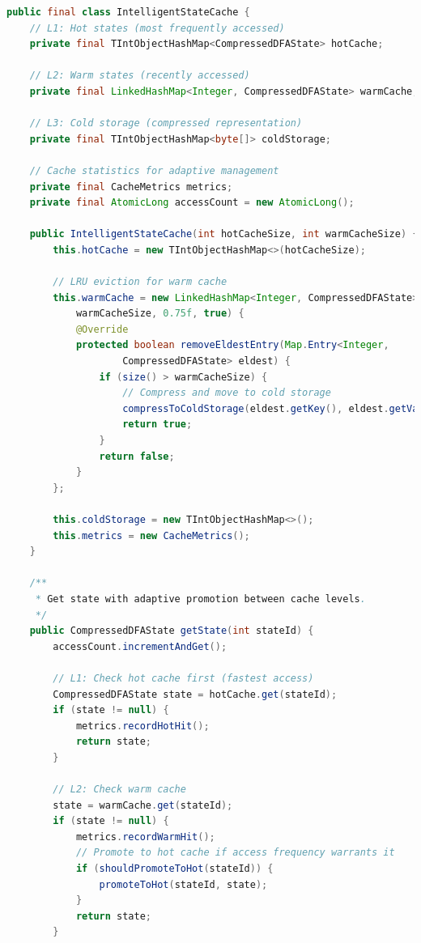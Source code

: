 \documentclass[11pt,a4paper]{article}
\begin{document}
\begin{lstlisting}[language=Java,caption={Multi-Level State Cache Implementation}]
public final class IntelligentStateCache {
    // L1: Hot states (most frequently accessed)
    private final TIntObjectHashMap<CompressedDFAState> hotCache;
    
    // L2: Warm states (recently accessed)
    private final LinkedHashMap<Integer, CompressedDFAState> warmCache;
    
    // L3: Cold storage (compressed representation)
    private final TIntObjectHashMap<byte[]> coldStorage;
    
    // Cache statistics for adaptive management
    private final CacheMetrics metrics;
    private final AtomicLong accessCount = new AtomicLong();
    
    public IntelligentStateCache(int hotCacheSize, int warmCacheSize) {
        this.hotCache = new TIntObjectHashMap<>(hotCacheSize);
        
        // LRU eviction for warm cache
        this.warmCache = new LinkedHashMap<Integer, CompressedDFAState>(
            warmCacheSize, 0.75f, true) {
            @Override
            protected boolean removeEldestEntry(Map.Entry<Integer, 
                    CompressedDFAState> eldest) {
                if (size() > warmCacheSize) {
                    // Compress and move to cold storage
                    compressToColdStorage(eldest.getKey(), eldest.getValue());
                    return true;
                }
                return false;
            }
        };
        
        this.coldStorage = new TIntObjectHashMap<>();
        this.metrics = new CacheMetrics();
    }
    
    /**
     * Get state with adaptive promotion between cache levels.
     */
    public CompressedDFAState getState(int stateId) {
        accessCount.incrementAndGet();
        
        // L1: Check hot cache first (fastest access)
        CompressedDFAState state = hotCache.get(stateId);
        if (state != null) {
            metrics.recordHotHit();
            return state;
        }
        
        // L2: Check warm cache
        state = warmCache.get(stateId);
        if (state != null) {
            metrics.recordWarmHit();
            // Promote to hot cache if access frequency warrants it
            if (shouldPromoteToHot(stateId)) {
                promoteToHot(stateId, state);
            }
            return state;
        }
        

\end{lstlisting}
\end{document}
